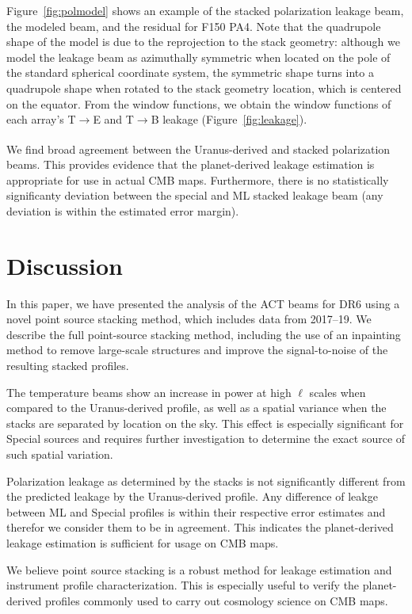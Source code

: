 Figure~\ref{fig:polmodel} shows an example of the stacked polarization leakage beam, the modeled beam, and the residual for F150 PA4. Note that the quadrupole shape of the model is due to the reprojection to the stack geometry: although we model the leakage beam as azimuthally symmetric when located on the pole of the standard spherical coordinate system, the symmetric shape turns into a quadrupole shape when rotated to the stack geometry location, which is centered on the equator. From the window functions, we obtain the window functions of each array's T$\xrightarrow[]{}$E and T$\xrightarrow[]{}$B leakage (Figure~\ref{fig:leakage}).

We find broad agreement between the Uranus-derived and stacked polarization beams.  This provides evidence that the planet-derived leakage estimation is appropriate for use in actual CMB maps.  Furthermore, there is no statistically significanty deviation between the special and ML stacked leakage beam (any deviation is within the estimated error margin).
\section{Discussion}
\label{sec:act_disc}
In this paper, we have presented the analysis of the ACT beams for DR6 using a novel point source stacking method, which includes data from 2017--19.  We describe the full point-source stacking method, including the use of an inpainting method to remove large-scale structures and improve the signal-to-noise of the resulting stacked profiles.

The temperature beams show an increase in power at high $\ell$ scales when compared to the Uranus-derived profile, as well as a spatial variance when the stacks are separated by location on the sky.  This effect is especially significant for Special sources and requires further investigation to determine the exact source of such spatial variation.

Polarization leakage as determined by the stacks is not significantly different from the predicted leakage by the Uranus-derived profile.  Any difference of leakge between ML and Special profiles is within their respective error estimates and therefor we consider them to be in agreement.  This indicates the planet-derived leakage estimation is sufficient for usage on CMB maps.

We believe point source stacking is a robust method for leakage estimation and instrument profile characterization.  This is especially useful to verify the planet-derived profiles commonly used to carry out cosmology science on CMB maps.
